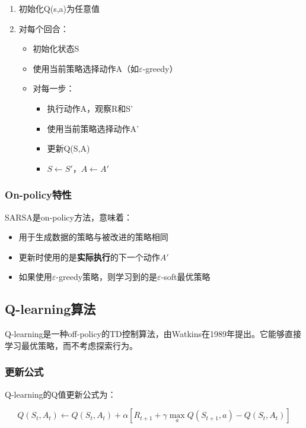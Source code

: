 \documentclass[12pt,a4paper]{article}
\begin{document}
\begin{enumerate}
    \item 初始化Q(s,a)为任意值
    \item 对每个回合：
    \begin{itemize}
        \item 初始化状态S
        \item 使用当前策略选择动作A（如$\varepsilon$-greedy）
        \item 对每一步：
        \begin{itemize}
            \item 执行动作A，观察R和S'
            \item 使用当前策略选择动作A'
            \item 更新Q(S,A)
            \item $S \leftarrow S'$，$A \leftarrow A'$
        \end{itemize}
    \end{itemize}
\end{enumerate}

\subsubsection{On-policy特性}

SARSA是on-policy方法，意味着：
\begin{itemize}
    \item 用于生成数据的策略与被改进的策略相同
    \item 更新时使用的是\textbf{实际执行}的下一个动作$A'$
    \item 如果使用$\varepsilon$-greedy策略，则学习到的是$\varepsilon$-soft最优策略
\end{itemize}

\subsection{Q-learning算法}

Q-learning是一种off-policy的TD控制算法，由Watkins在1989年提出。它能够直接学习最优策略，而不考虑探索行为。

\subsubsection{更新公式}

Q-learning的Q值更新公式为：

\begin{equation}
Q(S_t, A_t) \leftarrow Q(S_t, A_t) + \alpha [R_{t+1} + \gamma \max_a Q(S_{t+1}, a) - Q(S_t, A_t)]
\end{equation}
\end{document}
